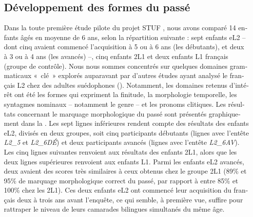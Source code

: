 \documentclass[french, output=paper]{langscibook}
\begin{document}
\begin{otherlanguage}{french}
\subsection{Développement des formes du passé}\label{sec:kihlstedt:4.3}

Dans la toute première étude pilote du projet STUF \citep{GranfeldtEtAl2007}, nous avons comparé 14 enfants âgés en moyenne de 6 ans, selon la répartition suivante : sept enfants eL2 -- dont cinq avaient commencé l’acquisition à 5 ou à 6 ans (les débutants), et deux à 3 ou à 4 ans (les avancés) --, cinq enfants 2L1 et deux enfants L1 français (groupe de contrôle). Nous nous sommes concentrés sur quelques domaines grammaticaux «~clé~» explorés auparavant par d’autres études ayant analysé le français L2 chez des adultes suédophones (\citealt{GranfeldtSchlyter1994, Schlyter1998, Kihlstedt2002}). Notamment, les domaines retenus d’intérêt ont été les formes qui expriment la finitude, la morphologie temporelle, les syntagmes nominaux -- notamment le genre -- et les pronoms clitiques. Les résultats concernant le marquage morphologique du passé sont présentés graphiquement dans la . Les sept lignes inférieures rendent compte des résultats des enfants eL2, divisés en deux groupes, soit cinq participants débutants (lignes avec l’entête \textit{L2\_5} et \textit{L2\_6DÉ}) et deux participants avancés (lignes avec l’entête \textit{L2\_6AV}).  Les cinq lignes suivantes renvoient aux résultats des enfants 2L1, alors que les deux lignes supérieures renvoient aux enfants L1. Parmi les enfants eL2 avancés, deux avaient des scores très similaires à ceux obtenus chez le groupe 2L1 (89\% et 95\% de marquage morphologique correct du passé, par rapport à entre 85\% et 100\% chez les 2L1). Ces deux enfants eL2 ont commencé leur acquisition du français deux à trois ans avant l’enquête, ce qui semble, à première vue, suffire pour rattraper le niveau de leurs camarades bilingues simultanés du même âge. 



\end{otherlanguage}
\end{document}
